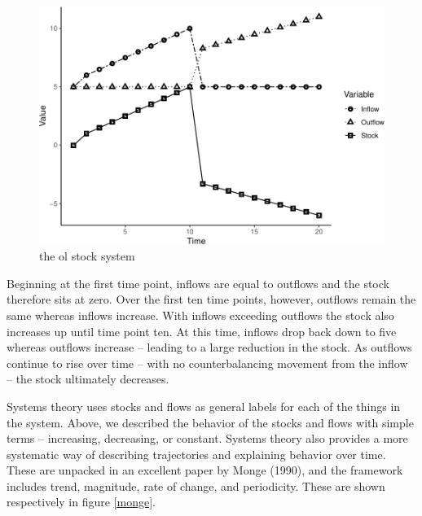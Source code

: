 \documentclass[english,,man]{apa6}
\theoremstyle{definition}
\theoremstyle{definition}
\theoremstyle{definition}
\theoremstyle{remark}
\begin{document}
\begin{figure}
\centering
\includegraphics{figs/unnamed-chunk-5-1.pdf}
\caption{\label{fig:unnamed-chunk-5}the ol stock system\label{stocks}}
\end{figure}

\noindent Beginning at the first time point, inflows are equal to
outflows and the stock therefore sits at zero. Over the first ten time
points, however, outflows remain the same whereas inflows increase. With
inflows exceeding outflows the stock also increases up until time point
ten. At this time, inflows drop back down to five whereas outflows
increase -- leading to a large reduction in the stock. As outflows
continue to rise over time -- with no counterbalancing movement from the
inflow -- the stock ultimately decreases.

Systems theory uses stocks and flows as general labels for each of the
things in the system. Above, we described the behavior of the stocks and
flows with simple terms -- increasing, decreasing, or constant. Systems
theory also provides a more systematic way of describing trajectories
and explaining behavior over time. These are unpacked in an excellent
paper by Monge (1990), and the framework includes trend, magnitude, rate
of change, and periodicity. These are shown respectively in figure
\ref{monge}.
\end{document}
